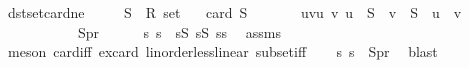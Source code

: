 \begin{isabellebody}
{\isafoldproof}%
%
\isadelimproof
\isanewline
%
\endisadelimproof
\isanewline
{}\isamarkupfalse%
\ dst{\isacharunderscore}{\kern0pt}set{\isacharunderscore}{\kern0pt}card{}{\isacharunderscore}{\kern0pt}ne{\isacharcolon}{\kern0pt}\isanewline
\ \ \ \ \ S\ {\isacharcolon}{\kern0pt}{\isacharcolon}{\kern0pt}\ {\isachardoublequoteopen}R{}\ set{\isachardoublequoteclose}\isanewline
\ \ \ {\isachardoublequoteopen}card\ S\ {\isasymge}\ {}{\isachardoublequoteclose}\isanewline
\ \ \ \ \ {\isachardoublequoteopen}{\isacharbraceleft}{\kern0pt}{\isacharparenleft}{\kern0pt}u{\isacharcomma}{\kern0pt}v{\isacharparenright}{\kern0pt}{\isacharbar}{\kern0pt}u\ v{\isachardot}{\kern0pt}\ u\ {\isasymin}\ S\ {\isasymand}\ v\ {\isasymin}\ S\ {\isasymand}\ u\ {\isacharless}{\kern0pt}\ v{\isacharbraceright}{\kern0pt}\ \ {\isasymnoteq}\ \ {\isacharbraceleft}{\kern0pt}{\isacharbraceright}{\kern0pt}{\isachardoublequoteclose}\ \isanewline
\ \ \ \ \ \ \ \ \ \ {\isacharparenleft}{\kern0pt}\ {\isachardoublequoteopen}{\isacharquery}{\kern0pt}Spr\ {\isasymnoteq}\ {\isacharbraceleft}{\kern0pt}{\isacharbraceright}{\kern0pt}{\isachardoublequoteclose}{\isacharparenright}{\kern0pt}\isanewline
%
\isadelimproof
%
\endisadelimproof
%
\isatagproof
{}\isamarkupfalse%
{\isacharminus}{\kern0pt}\isanewline
\ \ \isamarkupfalse%
\ s{}\ s{}\ \ {\isachardoublequoteopen}s{}{\isasymin}S{\isachardoublequoteclose}\ {\isachardoublequoteopen}s{}{\isasymin}S{\isachardoublequoteclose}\ {\isachardoublequoteopen}s{}{\isacharless}{\kern0pt}s{}{\isachardoublequoteclose}\ \isamarkupfalse%
\ assms\isanewline
\ \ \ \ \isamarkupfalse%
\ {\isacharparenleft}{\kern0pt}meson\ card{\isacharunderscore}{\kern0pt}{}{\isacharunderscore}{\kern0pt}iff{\isacharprime}{\kern0pt}\ ex{\isacharunderscore}{\kern0pt}card\ linorder{\isacharunderscore}{\kern0pt}less{\isacharunderscore}{\kern0pt}linear\ subset{\isacharunderscore}{\kern0pt}iff{\isacharparenright}{\kern0pt}\isanewline
\ \ \isamarkupfalse%
\ {\isachardoublequoteopen}{\isacharparenleft}{\kern0pt}s{}{\isacharcomma}{\kern0pt}\ s{}{\isacharparenright}{\kern0pt}\ {\isasymin}\ {\isacharquery}{\kern0pt}Spr{\isachardoublequoteclose}\ \isamarkupfalse%
\ blast\isanewline
\ \ \isamarkupfalse%

\end{isabellebody}
